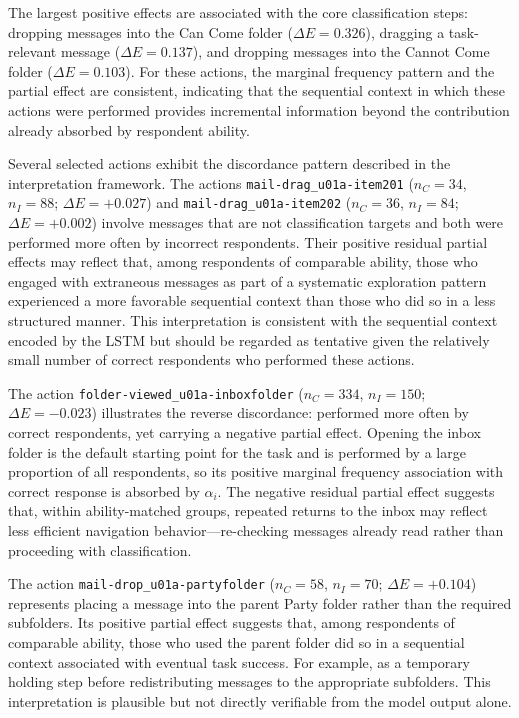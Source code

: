 The largest positive effects are associated with the core classification steps: dropping messages into the Can Come folder ($\Delta E = 0.326$), dragging a task-relevant message ($\Delta E = 0.137$), and dropping messages into the Cannot Come folder ($\Delta E = 0.103$). For these actions, the marginal frequency pattern and the partial effect are consistent, indicating that the sequential context in which these actions were performed provides incremental information beyond the contribution already absorbed by respondent ability.

Several selected actions exhibit the discordance pattern described in the interpretation framework. The actions \texttt{mail-drag\_u01a-item201} ($n_C = 34$, $n_I = 88$; $\Delta E = +0.027$) and \texttt{mail-drag\_u01a-item202} ($n_C = 36$, $n_I = 84$; $\Delta E = +0.002$) involve messages that are not classification targets and both were performed more often by incorrect respondents. Their positive residual partial effects may reflect that, among respondents of comparable ability, those who engaged with extraneous messages as part of a systematic exploration pattern experienced a more favorable sequential context than those who did so in a less structured manner. This interpretation is consistent with the sequential context encoded by the LSTM but should be regarded as tentative given the relatively small number of correct respondents who performed these actions.

The action \texttt{folder-viewed\_u01a-inboxfolder} ($n_C = 334$, $n_I = 150$; $\Delta E = -0.023$) illustrates the reverse discordance: performed more often by correct respondents, yet carrying a negative partial effect. Opening the inbox folder is the default starting point for the task and is performed by a large proportion of all respondents, so its positive marginal frequency association with correct response is absorbed by $\alpha_i$. The negative residual partial effect suggests that, within ability-matched groups, repeated returns to the inbox may reflect less efficient navigation behavior---re-checking messages already read rather than proceeding with classification.

The action \texttt{mail-drop\_u01a-partyfolder} ($n_C = 58$, $n_I = 70$; $\Delta E = +0.104$) represents placing a message into the parent Party folder rather than the required subfolders. Its positive partial effect suggests that, among respondents of comparable ability, those who used the parent folder did so in a sequential context associated with eventual task success. For example, as a temporary holding step before redistributing messages to the appropriate subfolders. This interpretation is plausible but not directly verifiable from the model output alone.

